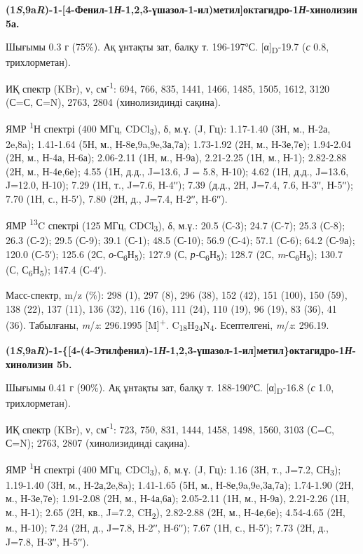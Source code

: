 \textbf{(1\emph{S},9a\emph{R})-1-{[}4-Фенил-1\emph{Н}-1,2,3-үшазол-1-ил)метил{]}октагидро-1\emph{Н}-хинолизин
5а.}

Шығымы 0.3 г (75\%). Ақ ұнтақты зат, балқу т. 196-197°С.
{[}α{]}\textsubscript{D}-19.7 (\emph{с} 0.8, трихлорметан).

ИҚ спектр (KBr), ν, см\textsuperscript{-1}: 694, 766, 835, 1441, 1466,
1485, 1505, 1612, 3120 (С=С, С=N), 2763, 2804 (хинолизидинді сақина).

ЯМР \textsuperscript{1}Н спектрі (400 МГц, CDCl\textsubscript{3}), δ,
м.ү. (J, Гц): 1.17-1.40 (3Н, м., Н-2а, 2e,8a); 1.41-1.64 (5Н, м.,
Н-8е,9a,9e,3а,7а); 1.73-1.92 (2Н, м., Н-3е,7е); 1.94-2.04 (2Н, м., Н-4а,
Н-6а); 2.06-2.11 (1Н, м., Н-9а), 2.21-2.25 (1Н, м., Н-1); 2.82-2.88 (2Н,
м., Н-4е,6е); 4.55 (1Н, д.д., J=13.6, J = 5.8, Н-10); 4.62 (1Н, д.д.,
J=13.6, J=12.0, Н-10); 7.29 (1Н, т., J=7.6, Н-4ʹʹ); 7.39 (д.д., 2Н,
J=7.4, 7.6, Н-3ʹʹ, Н-5ʹʹ); 7.70 (1Н, с., Н-5ʹ), 7.80 (2Н, д., J=7.4,
Н-2ʹʹ, Н-6ʹʹ).

ЯМР \textsuperscript{13}C спектрі (125 МГц, CDCl\textsubscript{3}), δ,
м.ү.: 20.5 (С-3); 24.7 (С-7); 25.3 (С-8); 26.3 (С-2); 29.5 (С-9); 39.1
(С-1); 48.5 (С-10); 56.9 (С-4); 57.1 (С-6); 64.2 (С-9а); 120.0 (С-5ʹ);
125.6 (2С, \emph{о}-С\textsubscript{6}Н\textsubscript{5}); 127.9 (С,
\emph{р-}С\textsubscript{6}Н\textsubscript{5}); 128.7 (2С,
\emph{m}-С\textsubscript{6}Н\textsubscript{5}); 130.7 (С,
С\textsubscript{6}Н\textsubscript{5}); 147.4 (С-4ʹ).

Масс-спектр, m/z (\%): 298 (1), 297 (8), 296 (38), 152 (42), 151 (100),
150 (59), 138 (22), 137 (11), 136 (32), 116 (16), 111 (24), 110 (19), 96
(19), 83 (36), 41 (36). Табылғаны, \emph{m}/\emph{z}: 296.1995
{[}M{]}\textsuperscript{+}.
C\textsubscript{18}H\textsubscript{24}N\textsubscript{4}. Есептелгені,
\emph{m}/\emph{z}: 296.19.

\textbf{(1\emph{S},9a\emph{R})-1-\{{[}4-(4-Этилфенил)-1\emph{Н}-1,2,3-үшазол-1-ил{]}метил\}октагидро-1\emph{Н}-хинолизин
5b.}

Шығымы 0.41 г (90\%). Ақ ұнтақты зат, балқу т. 188-190°С.
{[}α{]}\textsubscript{D}-16.8 (\emph{с} 1.0, трихлорметан).

ИҚ спектр (KBr), ν, см\textsuperscript{-1}: 723, 750, 831, 1444, 1458,
1498, 1560, 3103 (С=С, С=N); 2763, 2807 (хинолизидинді сақина).

ЯМР \textsuperscript{1}Н спектрі (400 МГц, CDCl\textsubscript{3}), δ,
м.ү. (J, Гц): 1.16 (3Н, т., J=7.2, СН\textsubscript{3}); 1.19-1.40 (3Н,
м., Н-2а,2e,8a); 1.41-1.65 (5Н, м., Н-8е,9a,9e,3а,7а); 1.74-1.90 (2Н,
м., Н-3е,7е); 1.91-2.08 (2Н, м., Н-4а,6а); 2.05-2.11 (1Н, м., Н-9а),
2.21-2.26 (1H, м., Н-1); 2.65 (2Н, кв., J=7.2, CH\textsubscript{2}),
2.82-2.88 (2Н, м., Н-4е,6е); 4.54-4.65 (2Н, м., Н-10); 7.24 (2Н, д.,
J=7.8, Н-2ʹʹ, Н-6ʹʹ); 7.67 (1Н, с., Н-5ʹ); 7.73 (2Н, д., J=7.8, H-3ʹʹ,
Н-5ʹʹ).

